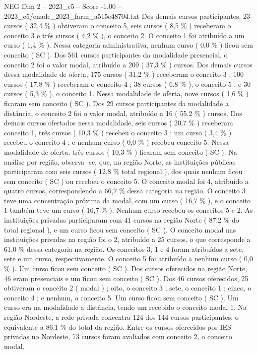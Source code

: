 \begin{textsample}{NEG Dim 2 – 2023\_c5 – Score -1.00 – 2023\_c5/enade\_2023\_farm\_a515e48704.txt}
Dos demais cursos participantes, 23 cursos ( 32,4 \% ) obtiveram o conceito 5, seis cursos ( 8,5 \% ) receberam o conceito 3 e três cursos ( 4,2 \% ), o conceito 2.
O conceito 1 foi atribuído a um curso ( 1,4 \% ).
Nessa categoria administrativa, nenhum curso ( 0,0 \% ) ficou sem conceito ( SC ).
Dos 561 cursos participantes da modalidade presencial, o conceito 2 foi o valor modal, atribuído a 209 ( 37,3 \% ) cursos.
Dos demais cursos dessa modalidade de oferta, 175 cursos ( 31,2 \% ) receberam o conceito 3 ; 100 cursos ( 17,8 \% ) receberam o conceito 4 ; 38 cursos ( 6,8 \% ), o conceito 5 ; e 30 cursos ( 5,3 \% ), o conceito 1.
Nessa modalidade de oferta, nove cursos ( 1,6 \% ) ficaram sem conceito ( SC ).
Dos 29 cursos participantes da modalidade a distância, o conceito 2 foi o valor modal, atribuído a 16 ( 55,2 \% ) cursos.
Dos demais cursos ofertados nessa modalidade, seis cursos ( 20,7 \% ) receberam conceito 1, três cursos ( 10,3 \% ) recebeu o conceito 3 ; um curso ( 3,4 \% ) recebeu o conceito 4 ; e nenhum curso ( 0,0 \% ) recebeu conceito 5.
Nessa modalidade de oferta, três cursos ( 10,3 \% ) ficaram sem conceito ( SC ).
Na análise por região, observa -se, que, na região Norte, as instituições públicas participaram com seis cursos ( 12,8 \% total regional ), dos quais nenhum ficou sem conceito ( SC ) ou recebeu o conceito 5.
O conceito modal foi 4, atribuído a quatro cursos, correspondendo a 66,7 \% dessa categoria na região.
O conceito 3 teve uma concentração próxima da modal, com um curso ( 16,7 \% ), e o conceito 1 também teve um curso ( 16,7 \% ).
Nenhum curso recebeu os conceitos 5 e 2.
As instituições privadas participaram com 41 cursos na região Norte ( 87,2 \% do total regional ), e um curso ficou sem conceito ( SC ).
O conceito modal nas instituições privadas na região foi o 2, atribuído a 25 cursos, o que corresponde a 61,0 \% dessa categoria na região.
Os conceitos 3, 1 e 4 foram atribuídos a sete, sete e um curso, respectivamente.
O conceito 5 foi atribuído a nenhum curso ( 0,0 \% ).
Um curso ficou sem conceito ( SC ).
Dos cursos oferecidos na região Norte, 46 eram presenciais e um ficou sem conceito ( SC ).
Dos 46 cursos oferecidos, 25 obtiveram o conceito 2 ( modal ) ; oito, o conceito 3 ; sete, o conceito 1 ; cinco, o conceito 4 ; e nenhum, o conceito 5.
Um curso ficou sem conceito ( SC ).
Um curso era na modalidade a distância, tendo um recebido o conceito modal 1.
Na região Nordeste, a rede privada concentra 124 dos 144 cursos participantes, o equivalente a 86,1 \% do total da região.
Entre os cursos oferecidos por IES privadas no Nordeste, 73 cursos foram avaliados com conceito 2, o conceito modal.

\end{textsample}
